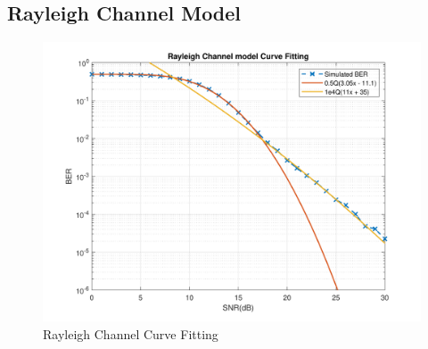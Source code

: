 \subsection{Rayleigh Channel Model}
\begin{figure}[htpb!]
	\centering
	\includegraphics[scale=0.7]{Graphics/Methodology/RaylCurveFit.pdf}
	\caption{Rayleigh Channel Curve Fitting}
	\label{fig:gaussCurveFit}
\end{figure}
